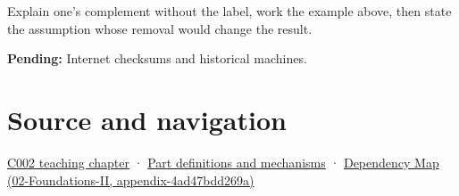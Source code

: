 Explain one's complement without the label, work the example above, then state the assumption whose removal would change the result.

\textbf{Pending:} Internet checksums and historical machines.

\section{Source and navigation}\label{appendix-03c678cd40b3-source-and-navigation}

\href{Continuous\%20Notes/Computing\%20Foundations\%20-\%20From\%20Bits\%20to\%20C++\%20and\%20Systems\%20APIs\#Arithmetic\%20becomes\%20a\%20policy}{C002 teaching chapter} · \hyperref[appendix-fd090d982a15]{Part definitions and mechanisms} · \href{../02-Foundations-II/main.pdf\#nameddest=appendix-4ad47bdd269a}{Dependency Map (02-Foundations-II, appendix-4ad47bdd269a)}
